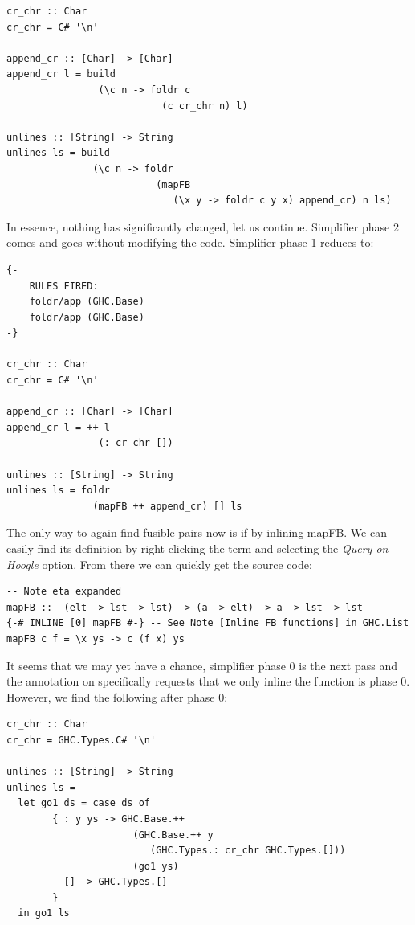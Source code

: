 \begin{listing}[H]
\begin{verbatim}
cr_chr :: Char
cr_chr = C# '\n'

append_cr :: [Char] -> [Char]
append_cr l = build
                (\c n -> foldr c
                           (c cr_chr n) l)

unlines :: [String] -> String
unlines ls = build
               (\c n -> foldr
                          (mapFB
                             (\x y -> foldr c y x) append_cr) n ls)
\end{verbatim}
\end{listing}

In essence, nothing has significantly changed, let us continue. Simplifier phase 2 comes and goes without modifying the code. Simplifier phase 1 reduces to:

\begin{listing}[H]
\begin{verbatim}
{-
    RULES FIRED:
    foldr/app (GHC.Base)
    foldr/app (GHC.Base)
-}

cr_chr :: Char
cr_chr = C# '\n'

append_cr :: [Char] -> [Char]
append_cr l = ++ l
                (: cr_chr [])

unlines :: [String] -> String
unlines ls = foldr
               (mapFB ++ append_cr) [] ls
\end{verbatim}
\end{listing}

The only way to again find fusible pairs now is if by inlining mapFB. We can easily find its definition by
right-clicking the term and selecting the \textit{Query on Hoogle} option. From there we can quickly get the
source code:

\begin{listing}[H]
\begin{verbatim}
-- Note eta expanded
mapFB ::  (elt -> lst -> lst) -> (a -> elt) -> a -> lst -> lst
{-# INLINE [0] mapFB #-} -- See Note [Inline FB functions] in GHC.List
mapFB c f = \x ys -> c (f x) ys
\end{verbatim}
\end{listing}

It seems that we may yet have a chance, simplifier phase 0 is the next pass and the annotation on  specifically
requests that we only inline the function is phase 0. However, we find the following after phase 0:

\begin{listing}[H]
\begin{verbatim}
cr_chr :: Char
cr_chr = GHC.Types.C# '\n'

unlines :: [String] -> String
unlines ls = 
  let go1 ds = case ds of
        { : y ys -> GHC.Base.++
                      (GHC.Base.++ y
                         (GHC.Types.: cr_chr GHC.Types.[]))
                      (go1 ys)
          [] -> GHC.Types.[]
        }
  in go1 ls
\end{verbatim}
\end{listing}

